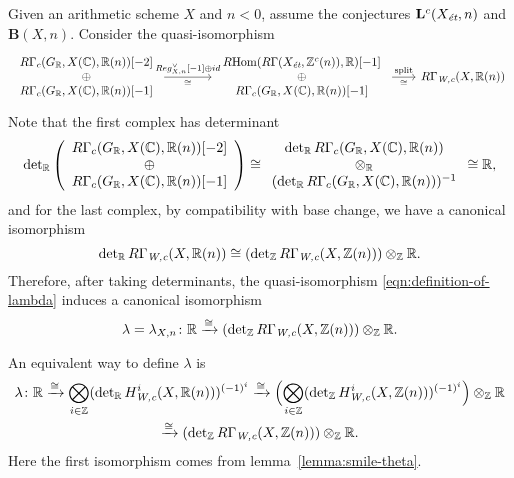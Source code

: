 \documentclass{article}
\numberwithin{equation}{section}
\begin{document}
\begin{definition}
  Given an arithmetic scheme $X$ and $n < 0$, assume the conjectures
  $\mathbf{L}^c (X_\et, n)$ and $\mathbf{B} (X,n)$. Consider the
  quasi-isomorphism
  \begin{equation}
    \label{eqn:definition-of-lambda}
    \begin{tikzcd}[column sep=4em]
      \begin{array}{c} R\Gamma_c (G_\RR, X (\CC), \RR (n)) [-2] \\ \oplus \\ R\Gamma_c (G_\RR, X (\CC), \RR (n)) [-1] \end{array} \ar{r}{Reg_{X,n}^\vee [-1] \oplus id}[swap]{\cong} & \begin{array}{c} \RHom (R\Gamma (X_\et, \ZZ^c (n)), \RR) [-1] \\ \oplus \\ R\Gamma_c (G_\RR, X (\CC), \RR (n)) [-1] \end{array} \ar{r}{\text{split}}[swap]{\cong} &[-2em] R\Gamma_\Wc (X, \RR (n))
    \end{tikzcd}
  \end{equation}
  Note that the first complex has determinant
  \[ \det_\RR \left(\begin{array}{c} R\Gamma_c (G_\RR, X (\CC), \RR (n)) [-2] \\ \oplus \\ R\Gamma_c (G_\RR, X (\CC), \RR (n)) [-1] \end{array}\right) \cong
    \begin{array}{c} \det_\RR R\Gamma_c (G_\RR, X (\CC), \RR (n)) \\ \otimes_\RR \\ (\det_\RR R\Gamma_c (G_\RR, X (\CC), \RR (n)))^{-1} \end{array} \cong \RR, \]
  and for the last complex, by compatibility with base change, we have a
  canonical isomorphism
  \[ \det_\RR R\Gamma_\Wc (X, \RR (n)) \cong
    (\det_\ZZ R\Gamma_\Wc (X, \ZZ (n))) \otimes_\ZZ \RR. \]
  Therefore, after taking determinants, the quasi-isomorphism
  \eqref{eqn:definition-of-lambda} induces a canonical isomorphism
  \begin{equation}
    \label{eqn:morphism-lambda}
    \lambda = \lambda_{X,n}\colon \RR \xrightarrow{\cong}
    (\det_\ZZ R\Gamma_\Wc (X, \ZZ (n))) \otimes_\ZZ \RR.
  \end{equation}
\end{definition}

\begin{remark}
  An equivalent way to define $\lambda$ is
  \begin{multline*}
    \lambda\colon \RR \xrightarrow{\cong}
    \bigotimes_{i\in \ZZ} (\det_\RR H^i_\Wc (X, \RR (n)))^{(-1)^i} \xrightarrow{\cong}
    \Bigl(\bigotimes_{i\in \ZZ} (\det_\ZZ H^i_\Wc (X, \ZZ (n)))^{(-1)^i}\Bigr) \otimes_\ZZ \RR \\
    \xrightarrow{\cong} (\det_\ZZ R\Gamma_\Wc (X, \ZZ (n))) \otimes_\ZZ \RR.
  \end{multline*}
  Here the first isomorphism comes from lemma~\ref{lemma:smile-theta}.
\end{remark}
\end{document}
